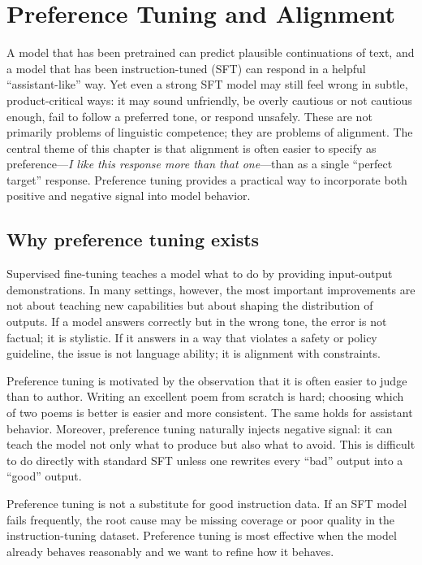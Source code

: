 
\chapter{Preference Tuning and Alignment}
\label{chap:alignment-preference-tuning}

A model that has been pretrained can predict plausible continuations of text, and a model that has been instruction-tuned (SFT) can respond in a helpful “assistant-like” way. Yet even a strong SFT model may still feel wrong in subtle, product-critical ways: it may sound unfriendly, be overly cautious or not cautious enough, fail to follow a preferred tone, or respond unsafely. These are not primarily problems of linguistic competence; they are problems of alignment. The central theme of this chapter is that alignment is often easier to specify as preference—\emph{I like this response more than that one}—than as a single “perfect target” response. Preference tuning provides a practical way to incorporate both positive and negative signal into model behavior.

\section{Why preference tuning exists}
Supervised fine-tuning teaches a model what to do by providing input-output demonstrations. In many settings, however, the most important improvements are not about teaching new capabilities but about shaping the distribution of outputs. If a model answers correctly but in the wrong tone, the error is not factual; it is stylistic. If it answers in a way that violates a safety or policy guideline, the issue is not language ability; it is alignment with constraints.

Preference tuning is motivated by the observation that it is often easier to judge than to author. Writing an excellent poem from scratch is hard; choosing which of two poems is better is easier and more consistent. The same holds for assistant behavior. Moreover, preference tuning naturally injects negative signal: it can teach the model not only what to produce but also what to avoid. This is difficult to do directly with standard SFT unless one rewrites every “bad” output into a “good” output.

Preference tuning is not a substitute for good instruction data. If an SFT model fails frequently, the root cause may be missing coverage or poor quality in the instruction-tuning dataset. Preference tuning is most effective when the model already behaves reasonably and we want to refine how it behaves.

